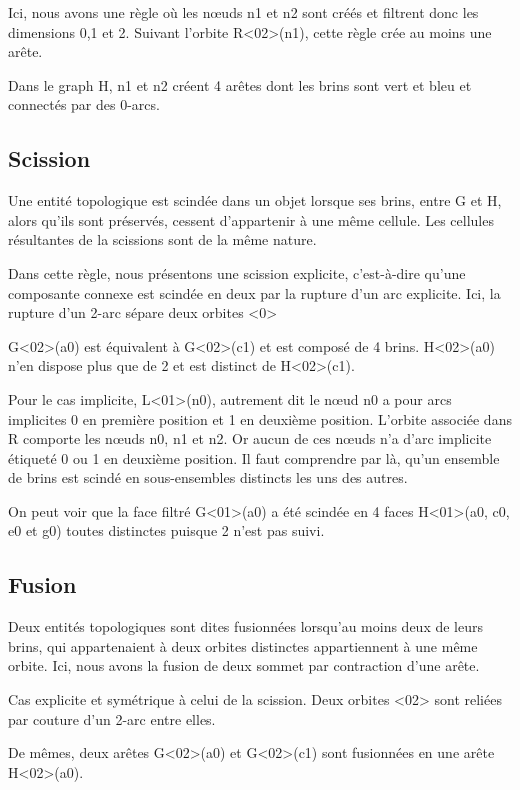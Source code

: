 \documentclass[a4paper]{article}
\begin{document}
Ici, nous avons une règle où les nœuds n1 et n2 sont créés et filtrent donc les dimensions 0,1 et 2.
Suivant l'orbite R<02>(n1), cette règle crée au moins une arête.

Dans le graph H, n1 et n2 créent 4 arêtes dont les brins sont vert et bleu et connectés par des 0-arcs.

\subsection{Scission}

Une entité topologique est scindée dans un objet lorsque ses brins, entre G et
H, alors qu'ils sont préservés, cessent d'appartenir à une même cellule. Les
cellules résultantes de la scissions sont de la même nature.

Dans cette règle, nous présentons une scission explicite, c'est-à-dire qu'une
composante connexe est scindée en deux par la rupture d'un arc explicite.
Ici, la rupture d'un 2-arc sépare deux orbites <0>

G<02>(a0) est équivalent à G<02>(c1) et est composé de 4 brins.
H<02>(a0) n'en dispose plus que de 2 et est distinct de H<02>(c1).

Pour le cas implicite, L<01>(n0), autrement dit le nœud n0 a pour arcs
implicites 0 en première position et 1 en deuxième position. L'orbite associée
dans R comporte les nœuds n0, n1 et n2. Or aucun de ces nœuds n'a d'arc
implicite étiqueté 0 ou 1 en deuxième position. Il faut comprendre par là, qu'un
ensemble de brins est scindé en sous-ensembles distincts les uns des autres.

On peut voir que la face filtré G<01>(a0) a été scindée en 4 faces
H<01>(a0, c0, e0 et g0) toutes distinctes puisque 2 n'est pas suivi.

\subsection{Fusion}

Deux entités topologiques sont dites fusionnées lorsqu'au moins deux de leurs
brins, qui appartenaient à deux orbites distinctes appartiennent à une même
orbite.
Ici, nous avons la fusion de deux sommet par contraction d'une arête.

Cas explicite et symétrique à celui de la scission. Deux orbites <02> sont
reliées par couture d'un 2-arc entre elles.

De mêmes, deux arêtes G<02>(a0) et G<02>(c1) sont fusionnées en une arête
H<02>(a0).
\end{document}
